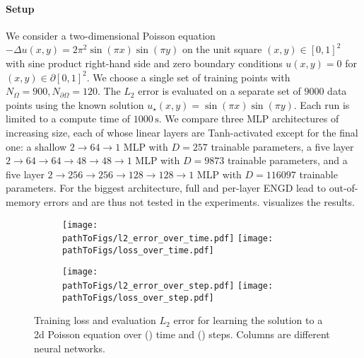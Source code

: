 \paragraph{Setup} We consider a two-dimensional Poisson equation $-\Delta u(x, y) = 2 \pi^2 \sin(\pi x) \sin(\pi y)$ on the unit square $(x,y) \in [0, 1]^2$ with sine product right-hand side and zero boundary conditions $u(x, y) = 0$ for $(x,y) \in \partial [0,1]^2$.
We choose a single set of training points with $N_{\Omega} = 900, N_{\partial\Omega} = 120$.
The $L_2$ error is evaluated on a separate set of $\num{9000}$ data points using the known solution $u_{\star}(x, y) = \sin(\pi x) \sin(\pi y)$.
Each run is limited to a compute time of $\num{1000}\,\text{s}$.
We compare three MLP architectures of increasing size, each of whose linear layers are Tanh-activated except for the final one: a shallow $2\to 64\to 1$ MLP with $D=257$ trainable parameters, a five layer $2 \to 64 \to 64 \to 48 \to 48 \to 1$ MLP with $D=\num{9873}$ trainable parameters, and a five layer $2 \to 256 \to 256\to 128 \to 128 \to 1$ MLP with $D=\num{116097}$ trainable parameters.
For the biggest architecture, full and per-layer ENGD lead to out-of-memory errors and are thus not tested in the experiments.
 visualizes the results.

\begin{figure}[!h]
  \centering
  \def\pathToFigs{kfac_pinns_exp/exp17_groupplot_poisson2d}
  \begin{subfigure}[t]{1.0\linewidth}
    \caption{}\label{subfig:poisson2d-time}
    \texttt{[image: \\pathToFigs/l2\_error\_over\_time.pdf]}
    \texttt{[image: \\pathToFigs/loss\_over\_time.pdf]}
  \end{subfigure}
  \begin{subfigure}[t]{1.0\linewidth}
    \caption{}\label{subfig:poisson2d-step}
    \texttt{[image: \\pathToFigs/l2\_error\_over\_step.pdf]}
    \texttt{[image: \\pathToFigs/loss\_over\_step.pdf]}
  \end{subfigure}
  \caption{ Training loss and evaluation $L_2$ error for learning the solution to a 2d Poisson equation over () time and () steps.
    Columns are different neural networks.}\label{fig:poisson2d-appendix}
\end{figure}

